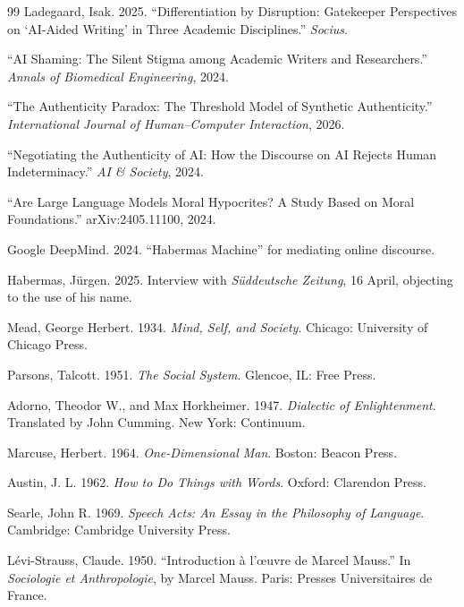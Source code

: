 \documentclass[12pt,a4paper]{article}
\begin{document}
\begin{thebibliography}{99}
Ladegaard, Isak. 2025. ``Differentiation by Disruption: Gatekeeper Perspectives on ‘AI-Aided Writing’ in Three Academic Disciplines.'' \emph{Socius}.

``AI Shaming: The Silent Stigma among Academic Writers and Researchers.'' \emph{Annals of Biomedical Engineering}, 2024.

``The Authenticity Paradox: The Threshold Model of Synthetic Authenticity.'' \emph{International Journal of Human–Computer Interaction}, 2026.

``Negotiating the Authenticity of AI: How the Discourse on AI Rejects Human Indeterminacy.'' \emph{AI \& Society}, 2024.

``Are Large Language Models Moral Hypocrites? A Study Based on Moral Foundations.'' arXiv:2405.11100, 2024.

Google DeepMind. 2024. ``Habermas Machine'' for mediating online discourse.

Habermas, Jürgen. 2025. Interview with \emph{Süddeutsche Zeitung}, 16 April, objecting to the use of his name.

Mead, George Herbert. 1934. \emph{Mind, Self, and Society}. Chicago: University of Chicago Press.

Parsons, Talcott. 1951. \emph{The Social System}. Glencoe, IL: Free Press.

Adorno, Theodor W., and Max Horkheimer. 1947. \emph{Dialectic of Enlightenment}. Translated by John Cumming. New York: Continuum.

Marcuse, Herbert. 1964. \emph{One-Dimensional Man}. Boston: Beacon Press.

Austin, J. L. 1962. \emph{How to Do Things with Words}. Oxford: Clarendon Press.

Searle, John R. 1969. \emph{Speech Acts: An Essay in the Philosophy of Language}. Cambridge: Cambridge University Press.

Lévi-Strauss, Claude. 1950. ``Introduction à l'œuvre de Marcel Mauss.'' In \emph{Sociologie et Anthropologie}, by Marcel Mauss. Paris: Presses Universitaires de France.


\end{thebibliography}
\end{document}
